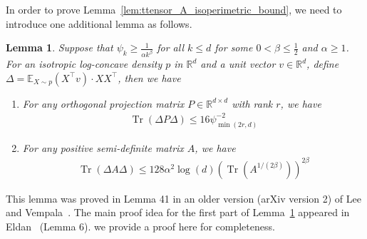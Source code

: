 \documentclass[11pt,twoside]{article}
\newcommand{\isoperi}{\psi}
\theoremstyle{named}
\theoremstyle{plain}
\newtheorem{lemma}{Lemma}
\newcommand{\Exs}{\ensuremath{{\mathbb{E}}}}
\newcommand{\usedim}{\ensuremath{d}}
\newcommand{\dims}{\usedim}
\DeclareMathOperator{\trace}{Tr}
\newcommand{\real}{\ensuremath{\mathbb{R}}}
\newcommand{\parenth}[1]{\left( #1 \right)}
\newcommand{\tp}{^\top}
\begin{document}
In order to prove Lemma~\ref{lem:ttensor_A_isoperimetric_bound}, we need to introduce one additional lemma as follows.
\begin{lemma}
  \label{lem:trace_DeltaDelta_bound}
  Suppose that $\isoperi_k \geq \frac{1}{\alpha k^\beta}$ for all $k \leq \dims$ for some $0 < \beta \leq \frac{1}{2}$ and $\alpha \geq 1$.  For an isotropic log-concave density $p$ in $\real^\dims$ and a unit vector $v \in \real^\dims$, define $\Delta = \Exs_{X \sim p} \parenth{X\tp v} \cdot XX\tp$, then we have
  \begin{enumerate}
    \item For any orthogonal projection matrix $P \in \real^{\dims \times \dims}$ with rank $r$, we have
    \begin{align*}
      \trace\parenth{\Delta P \Delta} \leq 16 \isoperi^{-2}_{\min(2r, \dims)}
    \end{align*}
    \item For any positive semi-definite matrix $A$, we have
    \begin{align*}
      \trace\parenth{\Delta A \Delta} \leq 128 \alpha^2 \log(\dims) \parenth{\trace\parenth{A^{1/(2\beta)}}}^{2\beta}
    \end{align*}
  \end{enumerate}
\end{lemma}
This lemma was proved in Lemma 41 in an older version (arXiv version 2) of Lee and Vempala~\cite{lee2016eldan}. The main proof idea for the first part of Lemma~\ref{lem:trace_DeltaDelta_bound} appeared in Eldan~\cite{eldan2013thin} (Lemma 6). we provide a proof here for completeness.
\end{document}
